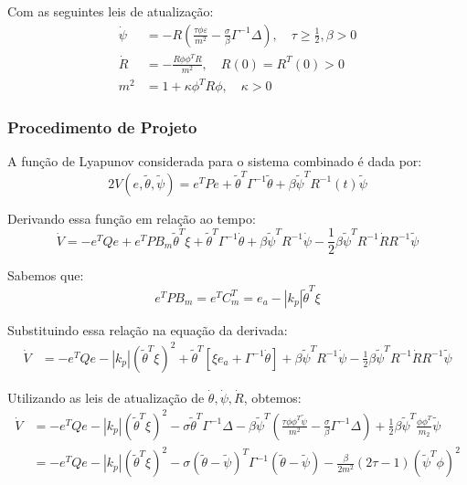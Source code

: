 \documentclass[10pt]{article}
\begin{document}
Com as seguintes leis de atualização:
\begin{align}
    \dot{\psi} &= -R \left( \frac{\tau \phi \varepsilon}{m^2} - \frac{\sigma}{\beta} \Gamma^{-1} \Delta \right), \quad \tau \geq \frac{1}{2}, \beta > 0 \\
    \dot{R} &= -\frac{R \phi \phi^T R}{m^2}, \quad R(0) = R^T(0) > 0 \\
    m^2 &= 1 + \kappa \phi^T R \phi, \quad \kappa > 0
\end{align}

\subsubsection{Procedimento de Projeto}

A função de Lyapunov considerada para o sistema combinado é dada por:
\begin{equation}
    2V(e, \tilde{\theta}, \tilde{\psi}) = e^T P e + \tilde{\theta}^T \Gamma^{-1} \tilde{\theta} + \beta \tilde{\psi}^T R^{-1}(t) \tilde{\psi}
\end{equation}

Derivando essa função em relação ao tempo:
\begin{equation}
    \dot{V} = -e^T Q e + e^T P B_m \tilde{\theta}^T \xi + \tilde{\theta}^T \Gamma^{-1} \dot{\theta} + \beta \tilde{\psi}^T R^{-1} \dot{\psi} - \frac{1}{2} \beta \tilde{\psi}^T R^{-1} \dot{R} R^{-1} \tilde{\psi}
\end{equation}

Sabemos que:
\begin{equation}
    e^T P B_m = e^T C_m^T = e_a - |k_p| \tilde{\theta}^T \xi
\end{equation}

Substituindo essa relação na equação da derivada:
\begin{align}
    \dot{V} &= -e^T Q e - |k_p|(\tilde{\theta}^T \xi)^2 + \tilde{\theta}^T [\xi e_a + \Gamma^{-1} \dot{\theta}] + \beta \tilde{\psi}^T R^{-1} \dot{\psi} - \frac{1}{2} \beta \tilde{\psi}^T R^{-1} \dot{R} R^{-1} \tilde{\psi}
\end{align}

Utilizando as leis de atualização de \(\dot{\theta}, \dot{\psi}, \dot{R}\), obtemos:
\begin{align}
    \dot{V} &= -e^T Q e - |k_p| (\tilde{\theta}^T \xi)^2 - \sigma \tilde{\theta}^T \Gamma^{-1} \Delta - \beta \tilde{\psi}^T \left( \frac{\tau \phi \phi^T \tilde{\psi}}{m^2} - \frac{\sigma}{\beta} \Gamma^{-1} \Delta \right) + \frac{1}{2} \beta \tilde{\psi}^T \frac{\phi \phi^T}{m_2} \tilde{\psi} \\
           &= -e^T Q e - |k_p| (\tilde{\theta}^T \xi)^2 - \sigma (\tilde{\theta} - \tilde{\psi})^T \Gamma^{-1} (\tilde{\theta} - \tilde{\psi}) - \frac{\beta}{2 m^2}(2\tau - 1)(\tilde{\psi}^T\phi)^2
\end{align}
\end{document}
